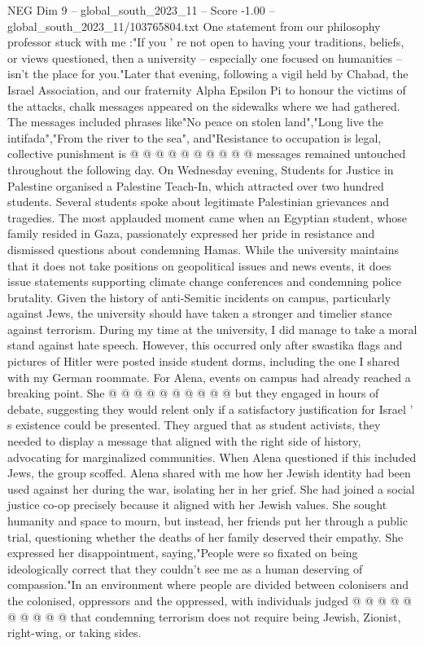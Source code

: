 \begin{textsample}{NEG Dim 9 – global\_south\_2023\_11 – Score -1.00 – global\_south\_2023\_11/103765804.txt}
One statement from our philosophy professor stuck with me :"If you ' re not open to having your traditions, beliefs, or views questioned, then a university -- especially one focused on humanities -- isn't the place for you."Later that evening, following a vigil held by Chabad, the Israel Association, and our fraternity Alpha Epsilon Pi to honour the victims of the attacks, chalk messages appeared on the sidewalks where we had gathered.
The messages included phrases like"No peace on stolen land","Long live the intifada","From the river to the sea", and"Resistance to occupation is legal, collective punishment is @ @ @ @ @ @ @ @ @ @ messages remained untouched throughout the following day.
On Wednesday evening, Students for Justice in Palestine organised a Palestine Teach-In, which attracted over two hundred students.
Several students spoke about legitimate Palestinian grievances and tragedies.
The most applauded moment came when an Egyptian student, whose family resided in Gaza, passionately expressed her pride in resistance and dismissed questions about condemning Hamas.
While the university maintains that it does not take positions on geopolitical issues and news events, it does issue statements supporting climate change conferences and condemning police brutality.
Given the history of anti-Semitic incidents on campus, particularly against Jews, the university should have taken a stronger and timelier stance against terrorism.
During my time at the university, I did manage to take a moral stand against hate speech.
However, this occurred only after swastika flags and pictures of Hitler were posted inside student dorms, including the one I shared with my German roommate.
For Alena, events on campus had already reached a breaking point.
She @ @ @ @ @ @ @ @ @ @ but they engaged in hours of debate, suggesting they would relent only if a satisfactory justification for Israel ' s existence could be presented.
They argued that as student activists, they needed to display a message that aligned with the right side of history, advocating for marginalized communities.
When Alena questioned if this included Jews, the group scoffed.
Alena shared with me how her Jewish identity had been used against her during the war, isolating her in her grief.
She had joined a social justice co-op precisely because it aligned with her Jewish values.
She sought humanity and space to mourn, but instead, her friends put her through a public trial, questioning whether the deaths of her family deserved their empathy.
She expressed her disappointment, saying,"People were so fixated on being ideologically correct that they couldn't see me as a human deserving of compassion."In an environment where people are divided between colonisers and the colonised, oppressors and the oppressed, with individuals judged @ @ @ @ @ @ @ @ @ @ that condemning terrorism does not require being Jewish, Zionist, right-wing, or taking sides.

\end{textsample}
